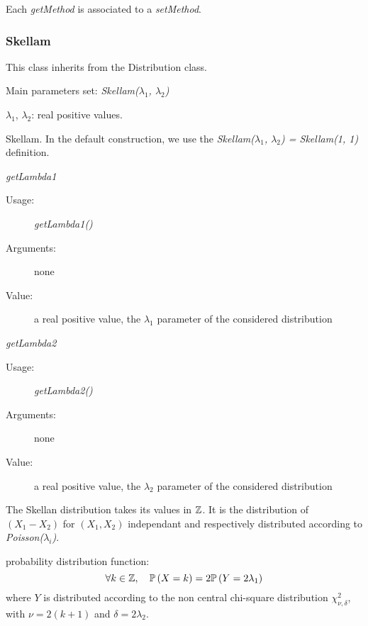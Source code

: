 Each  \textit{getMethod}  is associated to a \textit{setMethod}.

\newpage
\subsubsection{Skellam}

This class inherits from the Distribution class.

\begin{description}

\item[Usage:] Main parameters set: \textit{Skellam($\lambda_1$, $\lambda_2$)}

\item[Arguments:]   $\lambda_1$, $\lambda_2$:   real positive values.

\item[Value:] Skellam. In the default construction, we use the \textit{Skellam($\lambda_1$, $\lambda_2$) = Skellam(1, 1)} definition.

\item[Some methods:]  \rule{0pt}{1em}
\begin{description}

\item \textit{getLambda1}
\begin{description}
\item[Usage:] \textit{getLambda1()}
\item[Arguments:] none
\item[Value:]  a real positive value, the  $\lambda_1$ parameter of the considered distribution
\end{description}
\bigskip

\item \textit{getLambda2}
\begin{description}
\item[Usage:] \textit{getLambda2()}
\item[Arguments:] none
\item[Value:]  a real positive value, the  $\lambda_2$ parameter of the considered distribution
\end{description}
\bigskip

\end{description}


\item[Details:]  The Skellan distribution takes its values in ${\mathbb Z}$. It is the distribution of $(X_1-X_2)$ for $(X_1, X_2)$ independant and respectively distributed according to \textit{Poisson($\lambda_i$)}.
\begin{description}
\item probability distribution function:
\begin{equation}
\forall k \in {\mathbb Z}, \quad {\mathbb P}\left( X = k \right) = 2{\mathbb P}\left( Y=2\lambda_1 \right)
\end{equation}
where $Y$ is distributed according to the non central chi-square distribution $\chi^2_{\nu, \delta}$, with $\nu=2(k+1)$ and $\delta=2\lambda_2$.
\end{description}


\end{description}
